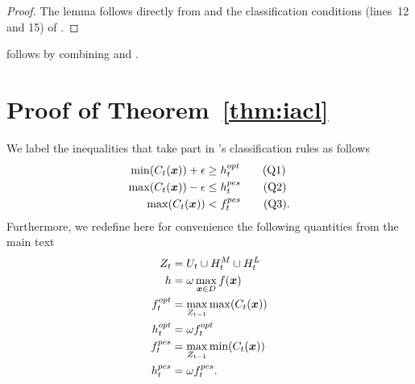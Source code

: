 
\begin{proof}
The lemma follows directly from  and the classification
conditions (lines~12 and 15) of .
\end{proof}

\noindent{} follows by combining 
and .


\section{Proof of Theorem~\ref*{thm:iacl}} \label{sect:app_iacl}

\begin{definition}
We label the inequalities that take part in \iacl's classification rules
as follows
\begin{align*}
\min(C_t(\bm{x})) + \epsilon &\geq h_t^{opt} \tag{Q1}\\
\max(C_t(\bm{x})) - \epsilon &\leq h_t^{pes} \tag{Q2}\\
\max(C_t(\bm{x})) &< f_t^{pes} \tag{Q3}.
\end{align*}
Furthermore, we redefine here for convenience the following quantities
from the main text
\begin{align*}
Z_t &= U_t \cup H^M_t \cup H^L_t\\
h &= \omega \max_{\bm{x} \in D} f(\bm{x})\\
f^{opt}_t &= \max_{Z_{t-1}}\max(C_t(\bm{x}))\\
h^{opt}_t &= \omega f^{opt}_t\\
f^{pes}_t &= \max_{Z_{t-1}}\min(C_t(\bm{x}))\\
h^{pes}_t &= \omega f^{pes}_t.
\end{align*}
\end{definition}

